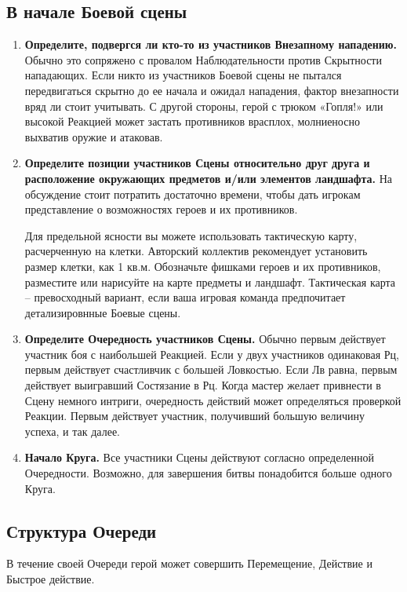 \subsection{В начале Боевой сцены}
\begin{enumerate}
  \item \textbf{Определите, подвергся ли кто-то из участников Внезапному нападению.} Обычно это сопряжено с провалом Наблюдательности против Скрытности нападающих. Если никто из участников Боевой сцены не пытался передвигаться скрытно до ее начала и ожидал нападения, фактор внезапности вряд ли стоит учитывать. С другой стороны, герой с трюком «Гопля!» или высокой Реакцией может застать противников врасплох, молниеносно выхватив оружие и атаковав.
  \item \textbf{Определите позиции участников Сцены относительно друг друга и расположение окружающих предметов и/или элементов ландшафта.} На обсуждение стоит потратить достаточно времени, чтобы дать игрокам представление о возможностях героев и их противников. 
    \begin{tcolorbox}
      Для предельной ясности вы можете использовать тактическую карту, расчерченную на клетки. Авторский коллектив рекомендует установить размер клетки, как 1 кв.м. Обозначьте фишками героев и их противников, разместите или нарисуйте на карте предметы и ландшафт. Тактическая карта – превосходный вариант, если ваша игровая команда предпочитает детализировнные Боевые сцены.
    \end{tcolorbox}
  \item \textbf{Определите Очередность участников Сцены.} Обычно первым действует участник боя с наибольшей Реакцией. Если у двух участников одинаковая Рц, первым действует счастливчик с большей Ловкостью. Если Лв равна, первым действует выигравший Состязание в Рц. 
    \newline Когда мастер желает привнести в Сцену немного интриги, очередность действий может определяться проверкой Реакции. Первым действует участник, получивший большую величину успеха, и так далее.
  \item \textbf{Начало Круга.} Все участники Сцены действуют согласно определенной Очередности. Возможно, для завершения битвы понадобится больше одного Круга.
\end{enumerate}

\subsection{Структура Очереди}
В течение своей Очереди герой может совершить Перемещение, Действие и Быстрое действие. 
